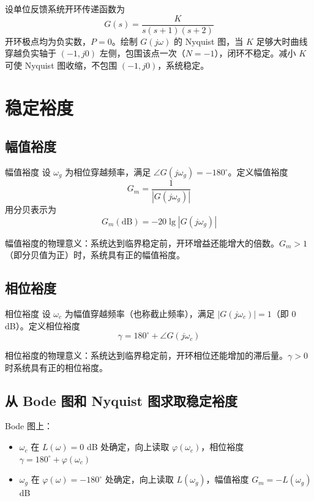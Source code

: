 \begin{example}
设单位反馈系统开环传递函数为
\[
G(s) = \frac{K}{s(s+1)(s+2)}
\]
开环极点均为负实数，$P = 0$。绘制 $G(j\omega)$ 的 Nyquist 图，当 $K$ 足够大时曲线穿越负实轴于 $(-1,j0)$ 左侧，包围该点一次（$N=-1$），闭环不稳定。减小 $K$ 可使 Nyquist 图收缩，不包围 $(-1,j0)$，系统稳定。
\end{example}

\section{稳定裕度}

\subsection{幅值裕度}

\begin{mydefinition}{幅值裕度}
设 $\omega_g$ 为相位穿越频率，满足 $\angle G(j\omega_g) = -180^{\circ}$。定义幅值裕度
\[
G_m = \frac{1}{|G(j\omega_g)|}
\]
用分贝表示为
\[
G_m(\text{dB}) = -20\lg |G(j\omega_g)|
\]
\end{mydefinition}

幅值裕度的物理意义：系统达到临界稳定前，开环增益还能增大的倍数。$G_m > 1$（即分贝值为正）时，系统具有正的幅值裕度。

\subsection{相位裕度}

\begin{mydefinition}{相位裕度}
设 $\omega_c$ 为幅值穿越频率（也称截止频率），满足 $|G(j\omega_c)| = 1$（即 $0$ dB）。定义相位裕度
\[
\gamma = 180^{\circ} + \angle G(j\omega_c)
\]
\end{mydefinition}

相位裕度的物理意义：系统达到临界稳定前，开环相位还能增加的滞后量。$\gamma > 0$ 时系统具有正的相位裕度。

\subsection{从 Bode 图和 Nyquist 图求取稳定裕度}

Bode 图上：
\begin{itemize}
    \item $\omega_c$ 在 $L(\omega) = 0$ dB 处确定，向上读取 $\varphi(\omega_c)$，相位裕度 $\gamma = 180^{\circ} + \varphi(\omega_c)$
    \item $\omega_g$ 在 $\varphi(\omega) = -180^{\circ}$ 处确定，向上读取 $L(\omega_g)$，幅值裕度 $G_m = -L(\omega_g)$ dB
\end{itemize}

